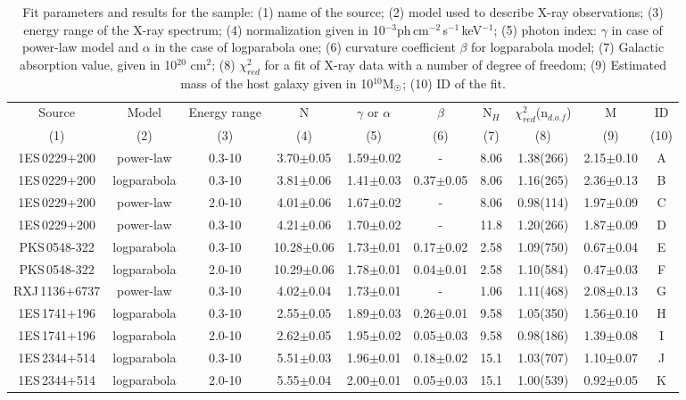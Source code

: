 




\begin{table*} 
\centering 
\begin{tabular}{c|c|c|c|c|c|c|c|c|c}
\hline
\hline
 Source &  Model  & Energy range & N & $\gamma$ or $\alpha$ & $\beta$  & N$_H$  & $\chi_{red}^2$(n$_{d.o.f}$) &  M & ID  \\
(1) &  (2)& (3) & (4) & (5) & (6)  & (7) & (8) & (9) & (10)   \\
\hline
1ES\,0229+200 & power-law    & 0.3-10 & 3.70$\pm$0.05 & 1.59$\pm$0.02 & - & 8.06 & 1.38(266)   &2.15$\pm$0.10 &  A\\
1ES\,0229+200 & logparabola  & 0.3-10 & 3.81$\pm$0.06 & 1.41$\pm$0.03 & 0.37$\pm$0.05 & 8.06 & 1.16(265)   & 2.36$\pm$0.13 &  B \\
1ES\,0229+200 & power-law    & 2.0-10 & 4.01$\pm$0.06 & 1.67$\pm$0.02 & - & 8.06 & 0.98(114)   & 1.97$\pm$0.09 & C \\
1ES\,0229+200 & power-law    & 0.3-10 & 4.21$\pm$0.06 & 1.70$\pm$0.02 & - & 11.8 & 1.20(266)   & 1.87$\pm$0.09 & D  \\
\hline
PKS\,0548-322 & logparabola  & 0.3-10 & 10.28$\pm$0.06 & 1.73$\pm$0.01 & 0.17$\pm$0.02 & 2.58 & 1.09(750)    &  0.67$\pm$0.04 & E  \\
PKS\,0548-322 & logparabola  & 2.0-10 & 10.29$\pm$0.06 & 1.78$\pm$0.01 & 0.04$\pm$0.01 & 2.58 &   1.10(584)   &0.47$\pm$0.03 & F \\
\hline
RXJ\,1136+6737 & power-law  & 0.3-10 & 4.02$\pm$0.04 & 1.73$\pm$0.01 & - & 1.06 &  1.11(468)   & 2.08$\pm$0.13 & G \\
\hline
1ES\,1741+196 & logparabola  & 0.3-10 & 2.55$\pm$0.05  & 1.89$\pm$0.03 & 0.26$\pm$0.01 & 9.58 &  1.05(350)   & 1.56$\pm$0.10 & H  \\
1ES\,1741+196  & logparabola  & 2.0-10 & 2.62$\pm$0.05 & 1.95$\pm$0.02 & 0.05$\pm$0.03 & 9.58 &  0.98(186)   & 1.39$\pm$0.08 & I \\
\hline
1ES\,2344+514 & logparabola  & 0.3-10 & 5.51$\pm$0.03 & 1.96$\pm$0.01 & 0.18$\pm$0.02 & 15.1 &   1.03(707)   & 1.10$\pm$0.07 & J \\
1ES\,2344+514 & logparabola  & 2.0-10 & 5.55$\pm$0.04 & 2.00$\pm$0.01 & 0.05$\pm$0.03 & 15.1 &   1.00(539)   &0.92$\pm$0.05  & K \\





\hline
\end{tabular}
\caption[]{Fit parameters and results for the sample:  (1) name of the source;  (2) model used to describe X-ray observations; (3) energy range of the X-ray spectrum;  (4) normalization given in 10$^{-3}$ph\,cm$^{-2}$\,s$^{-1}$\,keV$^{-1}$; (5) photon index: $\gamma$ in case of power-law model and $\alpha$ in the case of logparabola one; (6) curvature coefficient $\beta$ for logparabola model; (7) Galactic absorption value, given in 10$^{20}$ cm$^2$; (8) $\chi_{red}^2$ for a fit of X-ray data with a number of degree of freedom; (9)   Estimated mass of the host galaxy given in 10$^{10}$M$_{\astrosun}$; (10) ID of the fit.    }
  \label{table:results}
\end{table*}
